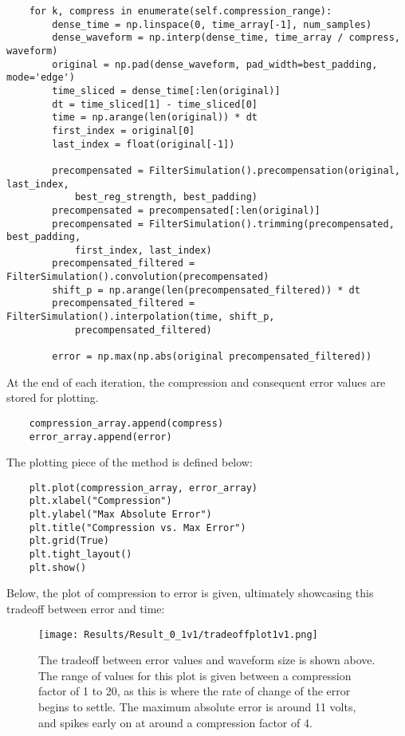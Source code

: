 \documentclass[11pt, a4paper]{article}
\theoremstyle{definition}
\numberwithin{equation}{section}
\begin{document}
\begin{verbatim}
    for k, compress in enumerate(self.compression_range):
        dense_time = np.linspace(0, time_array[-1], num_samples)
        dense_waveform = np.interp(dense_time, time_array / compress, waveform)
        original = np.pad(dense_waveform, pad_width=best_padding, mode='edge')
        time_sliced = dense_time[:len(original)]
        dt = time_sliced[1] - time_sliced[0]
        time = np.arange(len(original)) * dt
        first_index = original[0]
        last_index = float(original[-1])

        precompensated = FilterSimulation().precompensation(original, last_index, 
            best_reg_strength, best_padding)
        precompensated = precompensated[:len(original)]
        precompensated = FilterSimulation().trimming(precompensated, best_padding, 
            first_index, last_index)
        precompensated_filtered = FilterSimulation().convolution(precompensated)
        shift_p = np.arange(len(precompensated_filtered)) * dt
        precompensated_filtered = FilterSimulation().interpolation(time, shift_p, 
            precompensated_filtered)
                        
        error = np.max(np.abs(original precompensated_filtered))
\end{verbatim}

At the end of each iteration, the compression and consequent error values are stored for plotting.

\begin{verbatim}
    compression_array.append(compress)
    error_array.append(error)
\end{verbatim}

The plotting piece of the method is defined below:

\begin{verbatim}
    plt.plot(compression_array, error_array)
    plt.xlabel("Compression")
    plt.ylabel("Max Absolute Error")
    plt.title("Compression vs. Max Error")
    plt.grid(True)
    plt.tight_layout()
    plt.show()
\end{verbatim}

Below, the plot of compression to error is given, ultimately showcasing this tradeoff between error and time:

\begin{figure}[h!]
    \centering
\texttt{[image: Results/Result\_0\_1v1/tradeoffplot1v1.png]}
    \caption{The tradeoff between error values and waveform size is shown above. The range of values for this plot is given between a compression factor of 1 to 20, as this is where the rate of change of the error begins to settle. The maximum absolute error is around 11 volts, and spikes early on at around a compression factor of 4.}
\end{figure} \label{tradeoffplot1v1}
\end{document}
